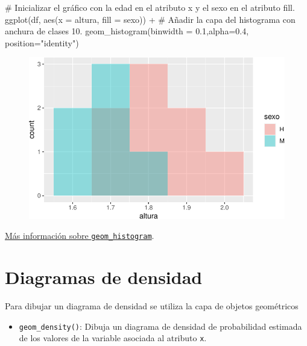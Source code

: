 \documentclass[
  a4paper,
]{scrreport}
\newenvironment{Shaded}{\begin{snugshade}}{\end{snugshade}}
\newcommand{\AttributeTok}[1]{\textcolor[rgb]{0.40,0.45,0.13}{#1}}
\newcommand{\CommentTok}[1]{\textcolor[rgb]{0.37,0.37,0.37}{#1}}
\newcommand{\FloatTok}[1]{\textcolor[rgb]{0.68,0.00,0.00}{#1}}
\newcommand{\FunctionTok}[1]{\textcolor[rgb]{0.28,0.35,0.67}{#1}}
\newcommand{\NormalTok}[1]{\textcolor[rgb]{0.00,0.23,0.31}{#1}}
\newcommand{\SpecialCharTok}[1]{\textcolor[rgb]{0.37,0.37,0.37}{#1}}
\newcommand{\StringTok}[1]{\textcolor[rgb]{0.13,0.47,0.30}{#1}}
\providecommand{\tightlist}{%
  \setlength{\itemsep}{0pt}\setlength{\parskip}{0pt}}\usepackage{longtable,booktabs,array}
\theoremstyle{definition}
\theoremstyle{definition}
\theoremstyle{remark}
\begin{document}
\begin{Shaded}
\begin{Highlighting}[]
\CommentTok{\# Inicializar el gráfico con la edad en el atributo x y el sexo en el atributo fill.}
\FunctionTok{ggplot}\NormalTok{(df, }\FunctionTok{aes}\NormalTok{(}\AttributeTok{x =}\NormalTok{ altura, }\AttributeTok{fill =}\NormalTok{ sexo)) }\SpecialCharTok{+}
\CommentTok{\# Añadir la capa del histograma con anchura de clases 10.}
    \FunctionTok{geom\_histogram}\NormalTok{(}\AttributeTok{binwidth =} \FloatTok{0.1}\NormalTok{,}\AttributeTok{alpha=}\FloatTok{0.4}\NormalTok{, }\AttributeTok{position=}\StringTok{"identity"}\NormalTok{)}
\end{Highlighting}
\end{Shaded}

\begin{figure}[H]

{\centering \includegraphics{07-graficos_files/figure-pdf/unnamed-chunk-18-1.pdf}

}

\end{figure}

\href{https://ggplot2.tidyverse.org/reference/geom_histogram.html}{Más
información sobre \texttt{geom\_histogram}}.

\hypertarget{diagramas-de-densidad}{%
\section{Diagramas de densidad}\label{diagramas-de-densidad}}

Para dibujar un diagrama de densidad se utiliza la capa de objetos
geométricos

\begin{itemize}
\tightlist
\item
  \texttt{geom\_density()}: Dibuja un diagrama de densidad de
  probabilidad estimada de los valores de la variable asociada al
  atributo \texttt{x}.
\end{itemize}
\end{document}

